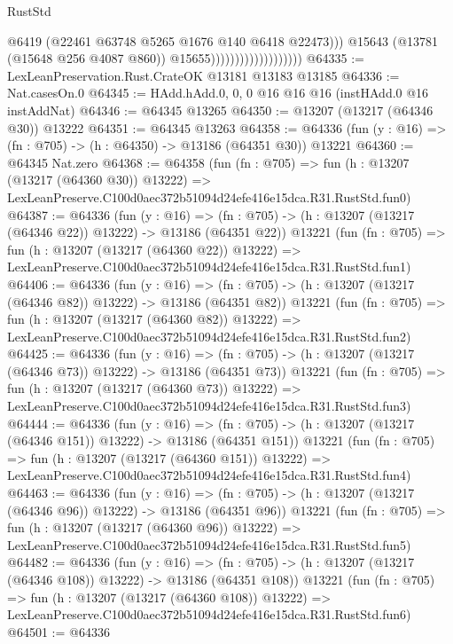 \begin{lexlean}{RustStd}
\begin{coremodule}
                                              @6419
                                              (@22461 @63748 @5265 @1676 @140 @6418 @22473)))
                                          @15643
                                          (@13781 (@15648 @256 @4087 @860))
                                          @15655)))))))))))))))))))
@64335 := LexLeanPreservation.Rust.CrateOK @13181 @13183 @13185
@64336 := Nat.casesOn.{0}
@64345 := HAdd.hAdd.{0, 0, 0} @16 @16 @16 (instHAdd.{0} @16 instAddNat)
@64346 := @64345 @13265
@64350 := @13207 (@13217 (@64346 @30)) @13222
@64351 := @64345 @13263
@64358 := @64336 (fun (y : @16) => (fn : @705) -> (h : @64350) -> @13186 (@64351 @30)) @13221
@64360 := @64345 Nat.zero
@64368 := @64358
    (fun (fn : @705) =>
    fun (h : @13207 (@13217 (@64360 @30)) @13222) =>
    LexLeanPreserve.C100d0aec372b51094d24efe416e15dca.R31.RustStd.fun0)
@64387 := @64336
    (fun (y : @16) =>
    (fn : @705) -> (h : @13207 (@13217 (@64346 @22)) @13222) -> @13186 (@64351 @22))
    @13221
    (fun (fn : @705) =>
    fun (h : @13207 (@13217 (@64360 @22)) @13222) =>
    LexLeanPreserve.C100d0aec372b51094d24efe416e15dca.R31.RustStd.fun1)
@64406 := @64336
    (fun (y : @16) =>
    (fn : @705) -> (h : @13207 (@13217 (@64346 @82)) @13222) -> @13186 (@64351 @82))
    @13221
    (fun (fn : @705) =>
    fun (h : @13207 (@13217 (@64360 @82)) @13222) =>
    LexLeanPreserve.C100d0aec372b51094d24efe416e15dca.R31.RustStd.fun2)
@64425 := @64336
    (fun (y : @16) =>
    (fn : @705) -> (h : @13207 (@13217 (@64346 @73)) @13222) -> @13186 (@64351 @73))
    @13221
    (fun (fn : @705) =>
    fun (h : @13207 (@13217 (@64360 @73)) @13222) =>
    LexLeanPreserve.C100d0aec372b51094d24efe416e15dca.R31.RustStd.fun3)
@64444 := @64336
    (fun (y : @16) =>
    (fn : @705) -> (h : @13207 (@13217 (@64346 @151)) @13222) -> @13186 (@64351 @151))
    @13221
    (fun (fn : @705) =>
    fun (h : @13207 (@13217 (@64360 @151)) @13222) =>
    LexLeanPreserve.C100d0aec372b51094d24efe416e15dca.R31.RustStd.fun4)
@64463 := @64336
    (fun (y : @16) =>
    (fn : @705) -> (h : @13207 (@13217 (@64346 @96)) @13222) -> @13186 (@64351 @96))
    @13221
    (fun (fn : @705) =>
    fun (h : @13207 (@13217 (@64360 @96)) @13222) =>
    LexLeanPreserve.C100d0aec372b51094d24efe416e15dca.R31.RustStd.fun5)
@64482 := @64336
    (fun (y : @16) =>
    (fn : @705) -> (h : @13207 (@13217 (@64346 @108)) @13222) -> @13186 (@64351 @108))
    @13221
    (fun (fn : @705) =>
    fun (h : @13207 (@13217 (@64360 @108)) @13222) =>
    LexLeanPreserve.C100d0aec372b51094d24efe416e15dca.R31.RustStd.fun6)
@64501 := @64336

\end{coremodule}
\end{lexlean}
